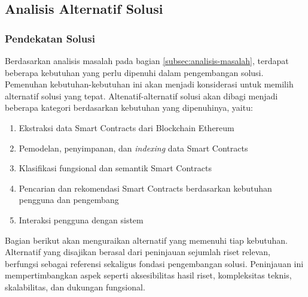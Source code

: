 \subsection{Analisis Alternatif Solusi}
\label{subsec:analisis-alternatif-solusi}

\subsubsection{Pendekatan Solusi}
Berdasarkan analisis masalah pada bagian \ref{subsec:analisis-masalah}, terdapat beberapa kebutuhan yang perlu dipenuhi dalam pengembangan solusi. Pemenuhan kebutuhan-kebutuhan ini akan menjadi konsiderasi untuk memilih alternatif solusi yang tepat. Altenatif-alternatif solusi akan dibagi menjadi beberapa kategori berdasarkan kebutuhan yang dipenuhinya, yaitu:

\begin{enumerate}
	\item Ekstraksi data Smart Contracts dari Blockchain Ethereum
	\item Pemodelan, penyimpanan, dan \textit{indexing} data Smart Contracts
	\item Klasifikasi fungsional dan semantik Smart Contracts
	\item Pencarian dan rekomendasi Smart Contracts berdasarkan kebutuhan pengguna dan pengembang
	\item Interaksi pengguna dengan sistem
\end{enumerate}

Bagian berikut akan menguraikan alternatif yang memenuhi tiap kebutuhan. Alternatif yang disajikan berasal dari peninjauan sejumlah riset relevan, berfungsi sebagai referensi sekaligus fondasi pengembangan solusi. Peninjauan ini mempertimbangkan aspek seperti aksesibilitas hasil riset, kompleksitas teknis, skalabilitas, dan dukungan fungsional.







